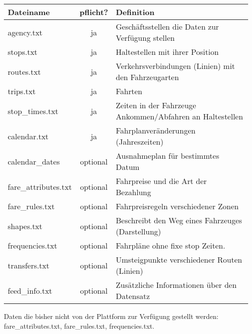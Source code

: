 \begin{tabular}{|l|c|l|}  \hline
	Dateiname & pflicht? & Definition \\ \hline
	agency.txt & ja & Geschäftsstellen die Daten zur Verfügung stellen \\ \hline
	stops.txt & ja & Haltestellen mit ihrer Position \\ \hline
	routes.txt & ja & Verkehrsverbindungen (Linien) mit den Fahrzeugarten \\ \hline %
	trips.txt & ja & Fahrten  \\ \hline												%
	stop\_times.txt & ja & Zeiten in der Fahrzeuge Ankommen/Abfahren an Haltestellen \\ \hline
	calendar.txt & ja & Fahrplanveränderungen (Jahreszeiten) \\ \hline
	calendar\_dates & optional & Ausnahmeplan für bestimmtes Datum \\ \hline
	fare\_attributes.txt & optional & Fahrpreise und die Art der Bezahlung \\ \hline
	fare\_rules.txt & optional & Fahrpreisregeln verschiedener Zonen  \\ \hline
	shapes.txt & optional & Beschreibt den Weg eines Fahrzeuges (Darstellung) \\ \hline
	frequencies.txt & optional & Fahrpläne ohne fixe stop Zeiten. \\ \hline
	transfers.txt & optional & Umsteigpunkte verschiedener Routen (Linien) \\ \hline
	feed\_info.txt & optional & Zusätzliche Informationen über den Datensatz \\ \hline	
\end{tabular}

Daten die bisher nicht von der Plattform zur Verfügung gestellt werden: fare\_attributes.txt, fare\_rules.txt, frequencies.txt.


